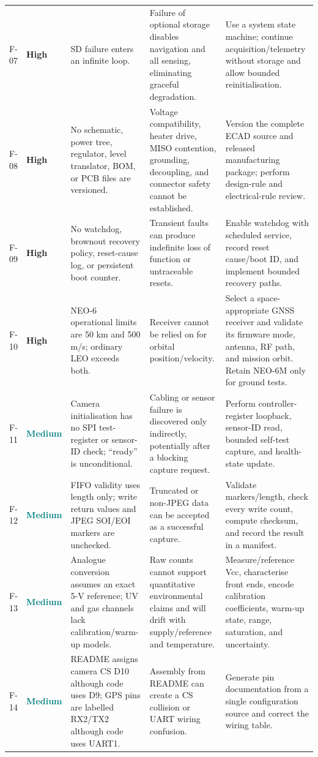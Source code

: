 \documentclass[11pt,a4paper]{article}
\newcommand{\status}[2]{\textcolor{#1}{\textbf{#2}}}
\newcommand{\high}{\status{amber}{High}}
\newcommand{\medium}{\status{teal}{Medium}}
\begin{document}
\begin{longtable}{P{0.07\textwidth}P{0.10\textwidth}P{0.21\textwidth}P{0.24\textwidth}P{0.25\textwidth}}
F-07 & \high & SD failure enters an infinite loop. & Failure of optional storage disables navigation and all sensing, eliminating graceful degradation. & Use a system state machine; continue acquisition/telemetry without storage and allow bounded reinitialisation.\\
F-08 & \high & No schematic, power tree, regulator, level translator, BOM, or PCB files are versioned. & Voltage compatibility, heater drive, MISO contention, grounding, decoupling, and connector safety cannot be established. & Version the complete ECAD source and released manufacturing package; perform design-rule and electrical-rule review.\\
F-09 & \high & No watchdog, brownout recovery policy, reset-cause log, or persistent boot counter. & Transient faults can produce indefinite loss of function or untraceable resets. & Enable watchdog with scheduled service, record reset cause/boot ID, and implement bounded recovery paths.\\
F-10 & \high & NEO-6 operational limits are 50 km and 500 m/s; ordinary LEO exceeds both. & Receiver cannot be relied on for orbital position/velocity. & Select a space-appropriate GNSS receiver and validate its firmware mode, antenna, RF path, and mission orbit. Retain NEO-6M only for ground tests.\\
F-11 & \medium & Camera initialisation has no SPI test-register or sensor-ID check; ``ready'' is unconditional. & Cabling or sensor failure is discovered only indirectly, potentially after a blocking capture request. & Perform controller-register loopback, sensor-ID read, bounded self-test capture, and health-state update.\\
F-12 & \medium & FIFO validity uses length only; write return values and JPEG SOI/EOI markers are unchecked. & Truncated or non-JPEG data can be accepted as a successful capture. & Validate markers/length, check every write count, compute checksum, and record the result in a manifest.\\
F-13 & \medium & Analogue conversion assumes an exact 5-V reference; UV and gas channels lack calibration/warm-up models. & Raw counts cannot support quantitative environmental claims and will drift with supply/reference and temperature. & Measure/reference Vcc, characterise front ends, encode calibration coefficients, warm-up state, range, saturation, and uncertainty.\\
F-14 & \medium & README assigns camera CS D10 although code uses D9; GPS pins are labelled RX2/TX2 although code uses UART1. & Assembly from README can create a CS collision or UART wiring confusion. & Generate pin documentation from a single configuration source and correct the wiring table.\\

\end{longtable}
\end{document}
